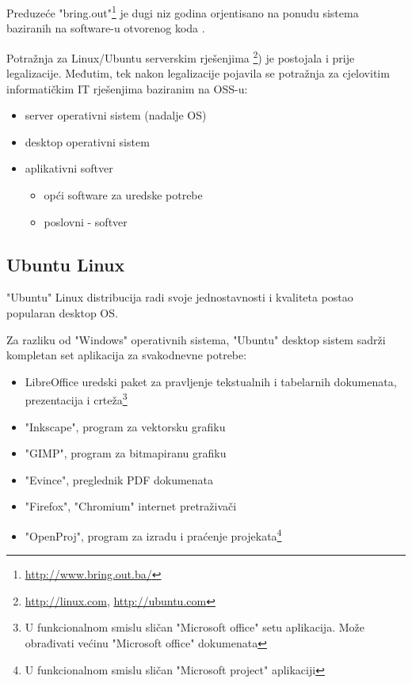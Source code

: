 \documentclass[times, utf8, seminar]{fit}
\begin{document}
Preduzeće "bring.out"\footnote{\url{http://www.bring.out.ba/}} je dugi niz godina orjentisano na ponudu sistema baziranih na software-u otvorenog koda .

Potražnja za Linux/Ubuntu serverskim rješenjima \footnote{\url{http://linux.com}, \url{http://ubuntu.com}}) je postojala i prije legalizacije. Međutim, tek nakon legalizacije pojavila se potražnja za cjelovitim informatičkim IT rješenjima baziranim na OSS-u:
\begin{itemize}
  \item server operativni sistem (nadalje OS)
  \item desktop operativni sistem
  \item aplikativni softver
  \begin{itemize}
    \item opći software za uredske potrebe
    \item poslovni - softver 
  \end{itemize}
\end{itemize}

\subsection{Ubuntu Linux}
"Ubuntu" Linux distribucija radi svoje jednostavnosti i kvaliteta postao popularan desktop OS.

Za razliku od "Windows" operativnih sistema, "Ubuntu" desktop sistem sadrži kompletan set aplikacija za svakodnevne potrebe:
\begin{itemize}
  \item LibreOffice uredski paket za pravljenje tekstualnih i tabelarnih dokumenata, prezentacija i crteža\footnote{U funkcionalnom smislu sličan "Microsoft office" setu aplikacija. Može obrađivati većinu "Microsoft office" dokumenata}
  \item "Inkscape", program za vektorsku grafiku \cite{inkscape}
  \item "GIMP", program za bitmapiranu grafiku
  \item "Evince", preglednik PDF dokumenata
  \item "Firefox", "Chromium" internet pretraživači
  \item "OpenProj", program za izradu i praćenje projekata\footnote{U funkcionalnom smislu sličan "Microsoft project" aplikaciji}
\end{itemize}  
\end{document}
